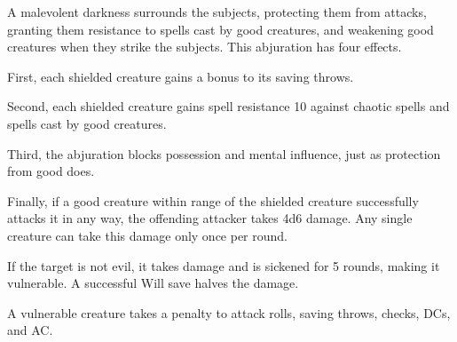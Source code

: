 \begin{comment}
\subsubsection{U-Z}
\end{comment}

\begin{spelleffect}
  A malevolent darkness surrounds the subjects, protecting them from attacks, granting them resistance to spells cast by good creatures, and weakening good creatures when they strike the subjects. This abjuration has four effects.
  \par First, each shielded creature gains a  bonus to its saving throws.
  \par Second, each shielded creature gains spell resistance 10 against chaotic spells and spells cast by good creatures.
  \par Third, the abjuration blocks possession and mental influence, just as protection from good does.
  \par Finally, if a good creature within \rngmed range of the shielded creature successfully attacks it in any way, the offending attacker takes 4d6 damage. Any single creature can take this damage only once per round.
\end{spelleffect}

\spellrng{\rngmed}
\begin{spelleffect}
  If the target is not evil, it takes damage and is sickened for 5 rounds, making it vulnerable. A successful Will save halves the damage.
\end{spelleffect}
\begin{spellnotes}
  A vulnerable creature takes a  penalty to attack rolls, saving throws, checks, DCs, and AC.
\end{spellnotes}


